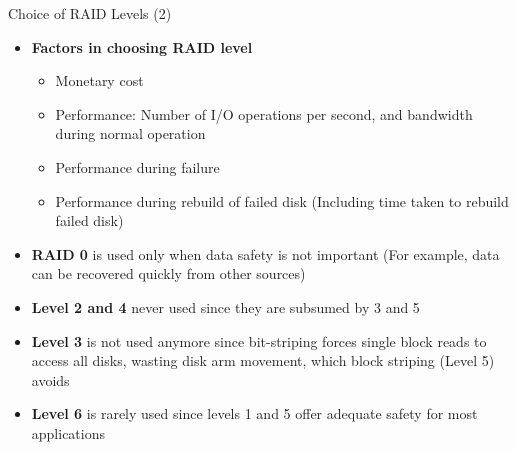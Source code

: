 \documentclass[aspectratio=169, xcolor=dvipsnames]{beamer}
\begin{document}
\begin{frame}{Choice of RAID Levels (2)}
    \begin{itemize}[<+->]
        \item \textbf{Factors in choosing RAID level}
        \begin{itemize}
            \item[$\triangleright$] Monetary cost
            \item[$\triangleright$] Performance: Number of I/O operations per second, and bandwidth during normal operation
            \item[$\triangleright$] Performance during failure
            \item[$\triangleright$] Performance during rebuild of failed disk (Including time taken to rebuild failed disk)
        \end{itemize}
        \item \textbf{RAID 0} is used only when data safety is not important (For example, data can be recovered quickly from other sources)
        \item \textbf{Level 2 and 4} never used since they are subsumed by 3 and 5
        \item \textbf{Level 3} is not used anymore since bit-striping forces single block reads to access all disks, wasting disk arm movement, which block striping (Level 5) avoids
        \item \textbf{Level 6} is rarely used since levels 1 and 5 offer adequate safety for most applications
    \end{itemize}
\end{frame}
\end{document}
